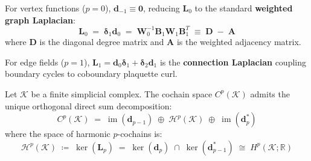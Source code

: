 \documentclass[
    12pt,
    a4paper,
    headings=normal,
    twoside=false,
    open=any,
    parskip=half
]{scrbook}
\begin{document}
For vertex functions ($p = 0$), $\mathbf{d}_{-1} \equiv \mathbf{0}$, reducing $\mathbf{L}_0$ to the standard \textbf{weighted graph Laplacian}:
\begin{equation}
\mathbf{L}_0 \;=\; \boldsymbol{\delta}_1 \mathbf{d}_0 \;=\; \mathbf{W}_0^{-1} \mathbf{B}_1 \mathbf{W}_1 \mathbf{B}_1^T \;\equiv\; \mathbf{D} \;-\; \mathbf{A}
\label{eq:ch1_graph_laplacian_reduction}
\end{equation}
where $\mathbf{D}$ is the diagonal degree matrix and $\mathbf{A}$ is the weighted adjacency matrix.

For edge fields ($p = 1$), $\mathbf{L}_1 = \mathbf{d}_0 \boldsymbol{\delta}_1 + \boldsymbol{\delta}_2 \mathbf{d}_1$ is the \textbf{connection Laplacian} coupling boundary cycles to coboundary plaquette curl.

\begin{phystheorem}\label{thm:ch1_combinatorial_hodge_decomposition}
Let $\mathcal{K}$ be a finite simplicial complex. The cochain space $C^p(\mathcal{K})$ admits the unique orthogonal direct sum decomposition:
\begin{equation}
C^p(\mathcal{K}) \;=\; \operatorname{im}\left( \mathbf{d}_{p-1} \right) \;\oplus\; \mathcal{H}^p(\mathcal{K}) \;\oplus\; \operatorname{im}\left( \mathbf{d}_p^* \right)
\label{eq:ch1_hodge_decomposition_master}
\end{equation}
where the space of harmonic $p$-cochains is:
\begin{equation}
\mathcal{H}^p(\mathcal{K}) \;\coloneqq\; \ker\left( \mathbf{L}_p \right) \;=\; \ker\left( \mathbf{d}_p \right) \;\cap\; \ker\left( \mathbf{d}_{p-1}^* \right) \;\cong\; H^p(\mathcal{K}; \mathbb{R})
\end{equation}
\end{phystheorem}
\end{document}
